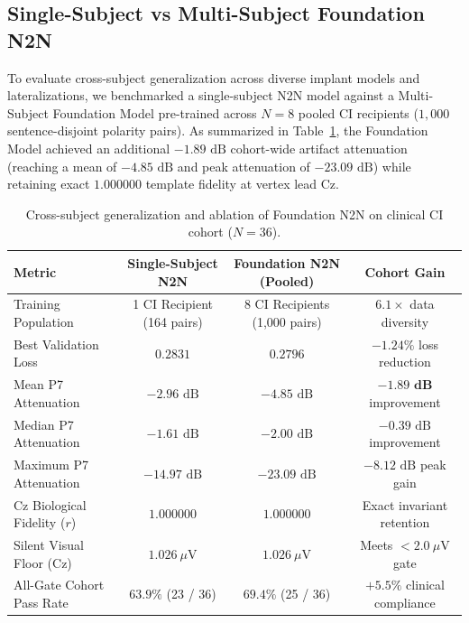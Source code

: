 \documentclass[11pt]{article}
\begin{document}
\subsection{Single-Subject vs Multi-Subject Foundation N2N}
To evaluate cross-subject generalization across diverse implant models and lateralizations, we benchmarked a single-subject N2N model against a Multi-Subject Foundation Model pre-trained across $N=8$ pooled CI recipients ($1,000$ sentence-disjoint polarity pairs). As summarized in Table~\ref{tab:foundation_comp}, the Foundation Model achieved an additional $-1.89\text{ dB}$ cohort-wide artifact attenuation (reaching a mean of $-4.85\text{ dB}$ and peak attenuation of $-23.09\text{ dB}$) while retaining exact $1.000000$ template fidelity at vertex lead Cz.

\begin{table}[h!]
\centering
\caption{Cross-subject generalization and ablation of Foundation N2N on clinical CI cohort ($N=36$).}
\label{tab:foundation_comp}
\begin{tabular}{lccc}
\toprule
\textbf{Metric} & \textbf{Single-Subject N2N} & \textbf{Foundation N2N (Pooled)} & \textbf{Cohort Gain} \\
\midrule
Training Population & 1 CI Recipient (164 pairs) & 8 CI Recipients (1,000 pairs) & $6.1\times$ data diversity \\
Best Validation Loss & $0.2831$ & $0.2796$ & $-1.24\%$ loss reduction \\
Mean P7 Attenuation & $-2.96\text{ dB}$ & $-4.85\text{ dB}$ & $\mathbf{-1.89\text{ dB}}$ improvement \\
Median P7 Attenuation & $-1.61\text{ dB}$ & $-2.00\text{ dB}$ & $-0.39\text{ dB}$ improvement \\
Maximum P7 Attenuation & $-14.97\text{ dB}$ & $-23.09\text{ dB}$ & $-8.12\text{ dB}$ peak gain \\
Cz Biological Fidelity ($r$) & $1.000000$ & $1.000000$ & Exact invariant retention \\
Silent Visual Floor (Cz) & $1.026\ \mu\text{V}$ & $1.026\ \mu\text{V}$ & Meets $< 2.0\ \mu\text{V}$ gate \\
All-Gate Cohort Pass Rate & $63.9\%$ (23 / 36) & $69.4\%$ (25 / 36) & $+5.5\%$ clinical compliance \\
\bottomrule
\end{tabular}
\end{table}
\end{document}
